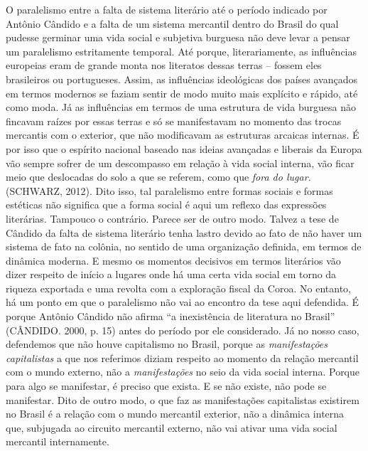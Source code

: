 O paralelismo entre a falta de sistema literário até o período indicado
por Antônio Cândido e a falta de um sistema mercantil dentro do Brasil
do qual pudesse germinar uma vida social e subjetiva burguesa não deve
levar a pensar um paralelismo estritamente temporal. Até porque,
literariamente, as influências europeias eram de grande monta nos
literatos dessas terras -- fossem eles brasileiros ou portugueses.
Assim, as influências ideológicas dos países avançados em termos
modernos se faziam sentir de modo muito mais explícito e rápido, até
como moda. Já as influências em termos de uma estrutura de vida burguesa
não fincavam raízes por essas terras e só se manifestavam no momento das
trocas mercantis com o exterior, que não modificavam as estruturas
arcaicas internas. É por isso que o espírito nacional baseado nas ideias
avançadas e liberais da Europa vão sempre sofrer de um descompasso em
relação à vida social interna, vão ficar meio que deslocadas do solo a
que se referem, como que \emph{fora do lugar.} (SCHWARZ, 2012). Dito
isso, tal paralelismo entre formas sociais e formas estéticas não
significa que a forma social é aqui um reflexo das expressões
literárias. Tampouco o contrário. Parece ser de outro modo. Talvez a
tese de Cândido da falta de sistema literário tenha lastro devido ao
fato de não haver um sistema de fato na colônia, no sentido de uma
organização definida, em termos de dinâmica moderna. E mesmo os momentos
decisivos em termos literários vão dizer respeito de início a lugares
onde há uma certa vida social em torno da riqueza exportada e uma
revolta com a exploração fiscal da Coroa. No entanto, há um ponto em que
o paralelismo não vai ao encontro da tese aqui defendida. É porque
Antônio Cândido não afirma ``a inexistência de literatura no Brasil''
(CÂNDIDO. 2000, p. 15) antes do período por ele considerado. Já no nosso
caso, defendemos que não houve capitalismo no Brasil, porque as
\emph{manifestações capitalistas} a que nos referimos diziam respeito ao
momento da relação mercantil com o mundo externo, não a
\emph{manifestações} no seio da vida social interna. Porque para algo se
manifestar, é preciso que exista. E se não existe, não pode se
manifestar. Dito de outro modo, o que faz as manifestações capitalistas
existirem no Brasil é a relação com o mundo mercantil exterior, não a
dinâmica interna que, subjugada ao circuito mercantil externo, não vai
ativar uma vida social mercantil internamente.

